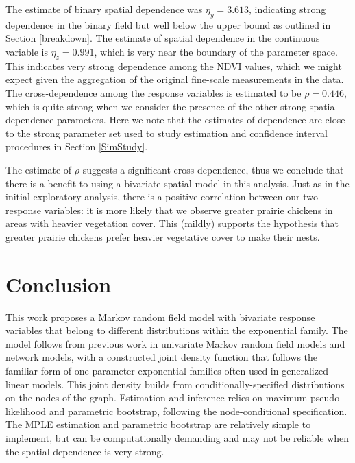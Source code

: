 \documentclass[12pt, a4paper, twoside]{article}
\begin{document}
The estimate of binary spatial dependence was $\eta_y = 3.613$, indicating strong dependence in the binary field but well below the upper bound as outlined in Section \ref{breakdown}. The estimate of spatial dependence in the continuous variable is $\eta_z = 0.991$, which is very near the boundary of the parameter space. This indicates very strong dependence among the NDVI values, which we might expect given the aggregation of the original fine-scale measurements in the data. The cross-dependence among the response variables is estimated to be $\rho = 0.446$, which is quite strong when we consider the presence of the other strong spatial dependence parameters. Here we note that the estimates of dependence are close to the strong parameter set used to study estimation and confidence interval procedures in Section \ref{SimStudy}.

The estimate of $\rho$ suggests a significant cross-dependence, thus we conclude that there is a benefit to using a bivariate spatial model in this analysis. Just as in the initial exploratory analysis, there is a positive correlation between our two response variables: it is more likely that we observe greater prairie chickens in areas with heavier vegetation cover. This (mildly) supports the hypothesis that greater prairie chickens prefer heavier vegetative cover to make their nests.


\section{Conclusion} \label{Conclusion}
This work proposes a Markov random field model with bivariate response variables that belong to different distributions within the exponential family. The model follows from previous work in univariate Markov random field models and network models, with a constructed joint density function that follows the familiar form of one-parameter exponential families often used in generalized linear models. This joint density builds from conditionally-specified distributions on the nodes of the graph. Estimation and inference relies on maximum pseudo-likelihood and parametric bootstrap, following the node-conditional specification. The MPLE estimation and parametric bootstrap are relatively simple to implement, but can be computationally demanding and may not be reliable when the spatial dependence is very strong.
\end{document}
